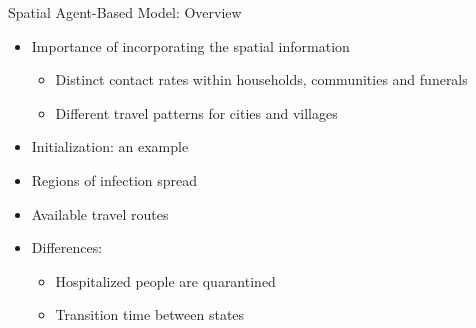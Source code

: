 \documentclass[30pt]{beamer}
\begin{document}
%
%
%      
%       
%        

\begin{frame}{Spatial Agent-Based Model: Overview}
\begin{itemize}
\item Importance of incorporating the spatial information
\begin{itemize}
\item Distinct contact rates within households, communities and funerals
\item Different travel patterns for cities and villages
\end{itemize}
\item Initialization: an example
\item Regions of infection spread
\item Available travel routes
\item Differences:
\begin{itemize}
\item Hospitalized people are quarantined
\item Transition time between states
\end{itemize}
\end{itemize}
\end{frame}
\end{document}

